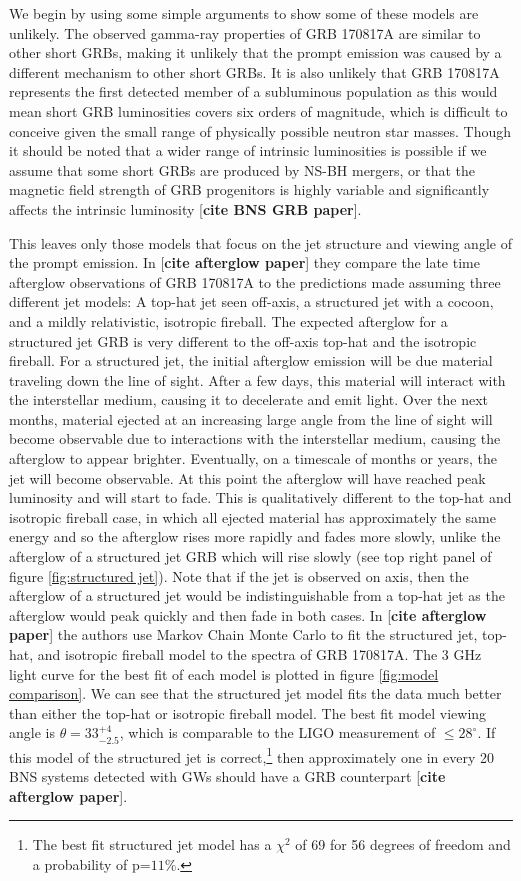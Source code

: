 \documentclass[11pt]{cuthesis}
\begin{document}
We begin by using some simple arguments to show some of these models are unlikely. The observed gamma-ray properties of GRB 170817A are similar to other short GRBs, making it unlikely that the prompt emission was caused by a different mechanism to other short GRBs. It is also unlikely that GRB 170817A represents the first detected member of a subluminous population as this would mean short GRB luminosities covers six orders of magnitude, which is difficult to conceive given the small range of physically possible neutron star masses. Though it should be noted that a wider range of intrinsic luminosities is possible if we assume that some short GRBs are produced by NS-BH mergers, or that the magnetic field strength of GRB progenitors is highly variable and significantly affects the intrinsic luminosity [\textbf{cite BNS GRB paper}].

This leaves only those models that focus on the jet structure and viewing angle of the prompt emission. In [\textbf{cite afterglow paper}] they compare the late time afterglow observations of GRB 170817A to the predictions made assuming three different jet models: A top-hat jet seen off-axis, a structured jet with a cocoon, and a mildly relativistic, isotropic fireball. The expected afterglow for a structured jet GRB is very different to the off-axis top-hat and the isotropic fireball. For a structured jet, the initial afterglow emission will be due material traveling down the line of sight. After a few days, this material will interact with the interstellar medium, causing it to decelerate and emit light. Over the next months, material ejected at an increasing large angle from the line of sight will become observable due to interactions with the interstellar medium, causing the afterglow to appear brighter. Eventually, on a timescale of months or years, the jet will become observable. At this point the afterglow will have reached peak luminosity and will start to fade. This is qualitatively different to the top-hat and isotropic fireball case, in which all ejected material has approximately the same energy and so the afterglow rises more rapidly and fades more slowly, unlike the afterglow of a structured jet GRB which will rise slowly (see top right panel of figure \ref{fig:structured jet}). Note that if the jet is observed on axis, then the afterglow of a structured jet would be indistinguishable from a top-hat jet as the afterglow would peak quickly and then fade in both cases. In [\textbf{cite afterglow paper}] the authors use Markov Chain Monte Carlo to fit the structured jet, top-hat, and isotropic fireball model to the spectra of GRB 170817A. The 3 GHz light curve for the best fit of each model is plotted in figure \ref{fig:model comparison}. We can see that the structured jet model fits the data much better than either the top-hat or isotropic fireball model. The best fit model viewing angle is $\theta = 33^{+4}_{-2.5}$, which is comparable to the LIGO measurement of $\leq 28^\circ$. If this model of the structured jet is correct,\footnote{The best fit structured jet model has a $\chi^2$ of 69 for 56 degrees of freedom and a probability of p=$11\%$.} then approximately one in every 20 BNS systems detected with GWs should have a GRB counterpart [\textbf{cite afterglow paper}]. 
\end{document}
